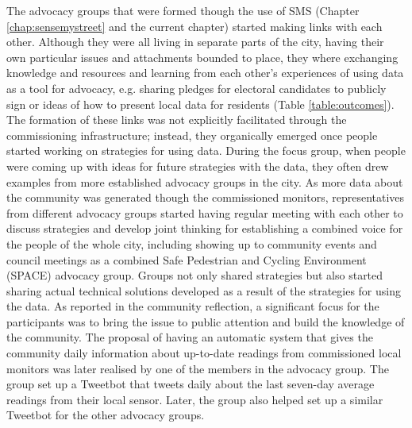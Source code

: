 The advocacy groups that were formed though the use of SMS (Chapter \ref{chap:sensemystreet} and the current chapter) started making links with each other. Although they were all living in separate parts of the city, having their own particular issues and attachments bounded to place, they where exchanging knowledge and resources and learning from each other's experiences of using data as a tool for advocacy, e.g. sharing pledges for electoral candidates to publicly sign or ideas of how to present local data for residents (Table \ref{table:outcomes}). The formation of these links was not explicitly facilitated through the commissioning infrastructure; instead, they organically emerged once people started working on strategies for using data. During the focus group, when people were coming up with ideas for future strategies with the data, they often drew examples from more established advocacy groups in the city. As more data about the community was generated though the commissioned monitors, representatives from different advocacy groups started having regular meeting with each other to discuss strategies and develop joint thinking for establishing a combined voice for the people of the whole city, including showing up to community events and council meetings as a combined Safe Pedestrian and Cycling Environment (SPACE) advocacy group. Groups not only shared strategies but also started sharing actual technical solutions developed as a result of the strategies for using the data. As reported in the community reflection, a significant focus for the participants was to bring the issue to public attention and build the knowledge of the community. The proposal of having an automatic system that gives the community daily information about up-to-date readings from commissioned local monitors was later realised by one of the members in the advocacy group. The group set up a Tweetbot that tweets daily about the last seven-day average readings from their local sensor. Later, the group also helped set up a similar Tweetbot for the other advocacy groups.

